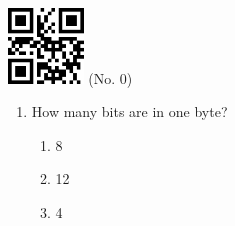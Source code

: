 \documentclass[twocolumn]{article}
\title{}
\date{}
\begin{document}

\begin{center}
 \hspace{0.2cm}
 \includegraphics[width=2cm]{qrcode-0.png}
 \hspace{0.5cm}
 \Large{  (No. 0) }
\end{center}



\begin{enumerate}



  \item How many bits are in one byte?

  \begin{enumerate}
   
   \item 8
   
   \item 12
   
   \item 4
   
  \end{enumerate}


\end{enumerate}


\end{document}
